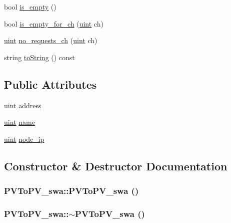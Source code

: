 \begin{CompactItemize}
\item 
bool \hyperlink{classPVToPV__swa_2c5f9c5a78aa05ab166b58d04738081d}{is\_\-empty} ()
\item 
bool \hyperlink{classPVToPV__swa_131c0ee2c54b76f6c10858889104edb4}{is\_\-empty\_\-for\_\-ch} (\hyperlink{outputBuffer_8h_91ad9478d81a7aaf2593e8d9c3d06a14}{uint} ch)
\item 
\hyperlink{outputBuffer_8h_91ad9478d81a7aaf2593e8d9c3d06a14}{uint} \hyperlink{classPVToPV__swa_31bf97288ff71191f3fc7210d29976a9}{no\_\-requests\_\-ch} (\hyperlink{outputBuffer_8h_91ad9478d81a7aaf2593e8d9c3d06a14}{uint} ch)
\item 
string \hyperlink{classPVToPV__swa_c0517af81f551c91f98f44dd0d6f257f}{toString} () const 
\end{CompactItemize}
\subsection*{Public Attributes}
\begin{CompactItemize}
\item 
\hyperlink{outputBuffer_8h_91ad9478d81a7aaf2593e8d9c3d06a14}{uint} \hyperlink{classPVToPV__swa_f6614400b4aa4b0c920a2d0a567ce42d}{address}
\item 
\hyperlink{outputBuffer_8h_91ad9478d81a7aaf2593e8d9c3d06a14}{uint} \hyperlink{classPVToPV__swa_9f673d0307d5d7b038138abcc78da074}{name}
\item 
\hyperlink{outputBuffer_8h_91ad9478d81a7aaf2593e8d9c3d06a14}{uint} \hyperlink{classPVToPV__swa_081f3bfa27f295b8fa262cb9ffdc50fa}{node\_\-ip}
\end{CompactItemize}


\subsection{Constructor \& Destructor Documentation}
\hypertarget{classPVToPV__swa_e61260956d80cbb85fbc88cc4405cbb1}{
\subsubsection[{PVToPV\_\-swa}]{\setlength{\rightskip}{0pt plus 5cm}PVToPV\_\-swa::PVToPV\_\-swa ()}}
\label{classPVToPV__swa_e61260956d80cbb85fbc88cc4405cbb1}


\hypertarget{classPVToPV__swa_cf2004091e12ac26b24e31124337e989}{
\subsubsection[{$\sim$PVToPV\_\-swa}]{\setlength{\rightskip}{0pt plus 5cm}PVToPV\_\-swa::$\sim$PVToPV\_\-swa ()}}
\label{classPVToPV__swa_cf2004091e12ac26b24e31124337e989}




